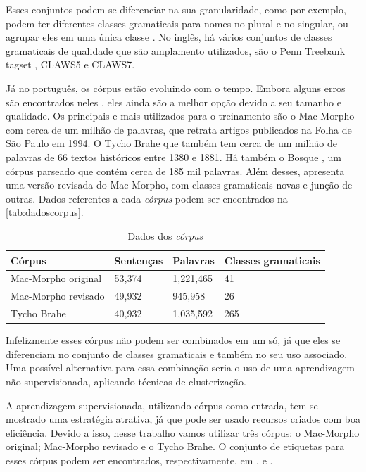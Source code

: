 Esses conjuntos podem se diferenciar na sua granularidade, como por exemplo, podem ter diferentes classes gramaticais para nomes no plural e no singular, ou agrupar eles em uma única classe \cite{fonseca2015evaluating}. No inglês, há vários conjuntos de classes gramaticais de qualidade que são amplamento utilizados, são o Penn Treebank tagset \cite{penntreebank}, CLAWS5 e CLAWS7.

Já no português, os córpus estão evoluindo com o tempo. Embora alguns erros são encontrados neles \cite{fonseca2013mac}, eles ainda são a melhor opção devido a seu tamanho e qualidade. Os principais e mais utilizados para o treinamento são o Mac-Morpho \cite{aluisio2003account} com cerca de um milhão de palavras, que retrata artigos publicados na Folha de São Paulo em 1994. O Tycho Brahe \cite{tychobrahe2010corpus} que também tem cerca de um milhão de palavras de 66 textos históricos entre 1380 e 1881. Há também o Bosque \cite{afonso2002floresta}, um córpus parseado que contém cerca de 185 mil palavras. Além desses, \cite{fonseca2015evaluating} apresenta uma versão revisada do Mac-Morpho, com classes gramaticais novas e junção de outras. Dados referentes a cada \textit{córpus} podem ser encontrados na \autoref{tab:dadoscorpus}.

\begin{table}[!htb]
\footnotesize
\centering
\caption{Dados dos \textit{córpus}}
\label{tab:dadoscorpus}
\begin{tabular}{m{4cm}m{2cm}m{2cm}m{4cm}}
  \toprule
  \textbf{Córpus} & \textbf{Sentenças}  & \textbf{Palavras}  & \textbf{Classes gramaticais}  \\
  \midrule
  Mac-Morpho original & 53,374 & 1,221,465 & 41  \\
  Mac-Morpho revisado & 49,932 & 945,958   & 26  \\
  Tycho Brahe         & 40,932 & 1,035,592 & 265 \\
  \bottomrule
\end{tabular}
\end{table}

Infelizmente esses córpus não podem ser combinados em um só, já que eles se diferenciam no conjunto de classes gramaticais e também no seu uso associado. Uma possível alternativa para essa combinação seria o uso de uma aprendizagem não supervisionada, aplicando técnicas de clusterização.

A aprendizagem supervisionada, utilizando córpus como entrada, tem se mostrado uma estratégia atrativa, já que pode ser usado recursos criados com boa eficiência. Devido a isso, nesse trabalho vamos utilizar três córpus: o Mac-Morpho original; Mac-Morpho revisado e o Tycho Brahe. O conjunto de etiquetas para esses córpus podem ser encontrados, respectivamente, em \cite{aluisio2003account}, \cite{fonseca2015evaluating} e \cite{temponi2004corpus}.



